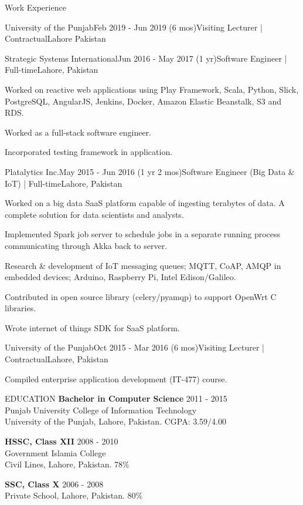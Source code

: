 \documentclass{resume}
\begin{document}
\begin{rSection}{Work Experience}
\begin{rSubsection}{University of the Punjab}{Feb 2019 - Jun 2019 (6 mos)}{Visiting Lecturer | Contractual}{Lahore Pakistan}
  \end{rSubsection}
  \begin{rSubsection}{Strategic Systems International}{Jun 2016 - May 2017 (1 yr)}{Software Engineer | Full-time}{Lahore, Pakistan}
    \item Worked on reactive web applications using Play Framework, Scala, Python, Slick, PostgreSQL, AngularJS, Jenkins, Docker, Amazon Elastic Beanstalk, S3 and RDS.
    \item Worked as a full-stack software engineer.
    \item Incorporated testing framework in application.
  \end{rSubsection}
  \begin{rSubsection}{Platalytics Inc.}{May 2015 - Jun 2016 (1 yr 2 mos)}{Software Engineer (Big Data \& IoT) | Full-time}{Lahore, Pakistan}
    \item Worked on a big data SaaS platform capable of ingesting terabytes of data. A complete solution for data scientists and analysts.
    \item Implemented Spark job server to schedule jobs in a separate running process communicating through Akka back to server.
    \item Research \& development of IoT messaging queues; MQTT, CoAP, AMQP in embedded devices; Arduino, Raspberry Pi, Intel Edison/Galileo.
    \item Contributed in open source library (celery/pyamqp) to support OpenWrt C libraries.
    \item Wrote internet of things SDK for SaaS platform.
  \end{rSubsection}
  \begin{rSubsection}{University of the Punjab}{Oct 2015 - Mar 2016 (6 mos)}{Visiting Lecturer | Contractual}{Lahore, Pakistan}
    \item Compiled enterprise application development (IT-477) course.
  \end{rSubsection}
\end{rSection}
\begin{rSection}{EDUCATION}
  {\bf Bachelor in Computer Science} \hfill {2011 - 2015}
  \\
  Punjab University College of Information Technology
  \\
  University of the Punjab, Lahore, Pakistan. CGPA: 3.59/4.00

  {\bf HSSC, Class XII} \hfill {2008 - 2010}
  \\
  Government Islamia College
  \\
  Civil Lines, Lahore, Pakistan. 78\% \break

    {\bf SSC, Class X}  \hfill {2006 - 2008}
  \\
  Private School, Lahore, Pakistan. 80\%

\end{rSection}
\end{document}
